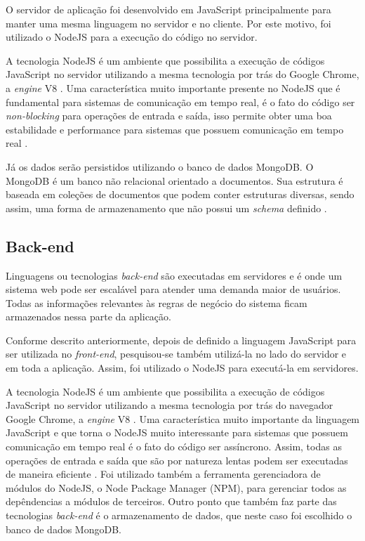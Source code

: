 O servidor de aplicação foi desenvolvido em JavaScript principalmente para manter uma mesma linguagem no servidor e no cliente. Por este motivo, foi utilizado o NodeJS para a execução do código no servidor.

A tecnologia NodeJS é um ambiente que possibilita a execução de códigos JavaScript no servidor utilizando a mesma tecnologia por trás do Google Chrome, a \emph{engine} V8 \cite{nodejs}. Uma característica muito importante presente no NodeJS que é fundamental para sistemas de comunicação em tempo real, é o fato do código ser \emph{non-blocking} para operações de entrada e saída, isso permite obter uma boa estabilidade e performance para sistemas que possuem comunicação em tempo real \cite{nodejs}.

Já os dados serão persistidos utilizando o banco de dados MongoDB. O MongoDB é um banco não relacional orientado a documentos. Sua estrutura é baseada em coleções de documentos que podem conter estruturas diversas, sendo assim, uma forma de armazenamento que não possui um \emph{schema} definido \cite{mongodb}. 

\fi

\subsection{Back-end}
\label{sec:tecnologias_backend}

Linguagens ou tecnologias \emph{back-end} são executadas em servidores e é onde um sistema web pode ser escalável para atender uma demanda maior de usuários. Todas as informações relevantes às regras de negócio do sistema ficam armazenados nessa parte da aplicação.

Conforme descrito anteriormente, depois de definido a linguagem JavaScript para ser utilizada no \emph{front-end}, pesquisou-se também utilizá-la no lado do servidor e em toda a aplicação. Assim, foi utilizado o NodeJS para executá-la em servidores.

A tecnologia NodeJS é um ambiente que possibilita a execução de códigos JavaScript no servidor utilizando a mesma tecnologia por trás do navegador Google Chrome, a \emph{engine} V8 \cite{nodejs}. Uma característica muito importante da linguagem JavaScript e que torna o NodeJS muito interessante para sistemas que possuem comunicação em tempo real é o fato do código ser assíncrono. Assim, todas as operações de entrada e saída que são por natureza lentas podem ser executadas de maneira eficiente \cite{nodejs}. Foi utilizado também a ferramenta gerenciadora de módulos do NodeJS, o Node Package Manager (NPM), para gerenciar todos as depêndencias a módulos de terceiros. Outro ponto que também faz parte das tecnologias \emph{back-end} é o armazenamento de dados, que neste caso foi escolhido o banco de dados MongoDB.

